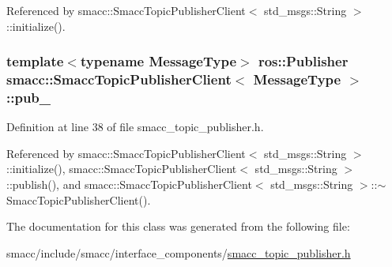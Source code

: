 Referenced by smacc\+::\+Smacc\+Topic\+Publisher\+Client$<$ std\+\_\+msgs\+::\+String $>$\+::initialize().

\subsubsection[{\texorpdfstring{pub\+\_\+}{pub_}}]{\setlength{\rightskip}{0pt plus 5cm}template$<$typename Message\+Type$>$ ros\+::\+Publisher {\bf smacc\+::\+Smacc\+Topic\+Publisher\+Client}$<$ Message\+Type $>$\+::pub\+\_\+\hspace{0.3cm}{\ttfamily [protected]}}\hypertarget{classsmacc_1_1SmaccTopicPublisherClient_a29d9f2055484e74922c65f0c036e1e31}{}\label{classsmacc_1_1SmaccTopicPublisherClient_a29d9f2055484e74922c65f0c036e1e31}


Definition at line 38 of file smacc\+\_\+topic\+\_\+publisher.\+h.



Referenced by smacc\+::\+Smacc\+Topic\+Publisher\+Client$<$ std\+\_\+msgs\+::\+String $>$\+::initialize(), smacc\+::\+Smacc\+Topic\+Publisher\+Client$<$ std\+\_\+msgs\+::\+String $>$\+::publish(), and smacc\+::\+Smacc\+Topic\+Publisher\+Client$<$ std\+\_\+msgs\+::\+String $>$\+::$\sim$\+Smacc\+Topic\+Publisher\+Client().



The documentation for this class was generated from the following file\+:\begin{DoxyCompactItemize}
\item 
smacc/include/smacc/interface\+\_\+components/\hyperlink{smacc__topic__publisher_8h}{smacc\+\_\+topic\+\_\+publisher.\+h}\end{DoxyCompactItemize}
